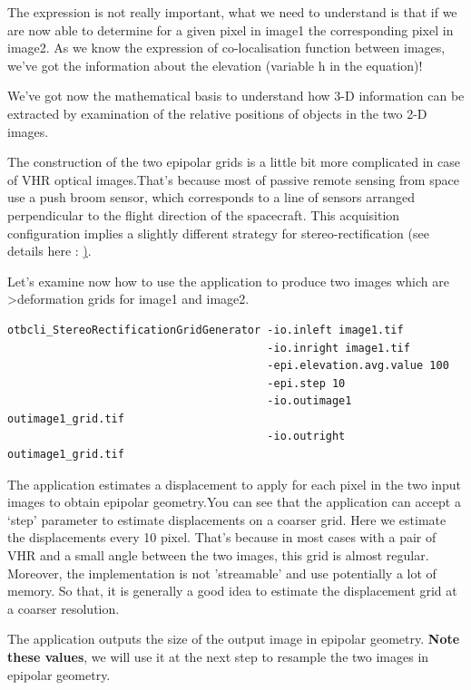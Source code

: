 The expression is not really important, what we need to understand is that if we
are now able to determine for a given pixel in image1 the corresponding pixel in
image2.  As we know the expression of co-localisation function between images,
we've got the information about the elevation (variable h in the equation)!

We've got now the mathematical basis to understand how 3-D information can be
extracted by examination of the relative positions of objects in the two 2-D
images.

The construction of the two epipolar grids is a little bit more complicated in
case of VHR optical images.That's because most of passive remote sensing from
space use a push broom sensor, which corresponds to a line of sensors arranged
perpendicular to the flight direction of the spacecraft. This acquisition
configuration implies a slightly different strategy for stereo-rectification
(see details here :
\href{http://en.wikipedia.org/wiki/Epipolar_geometry#Epipolar_geometry_of_pushbroom_sensor}).

Let's examine now how to use the 
application to produce two images which are \textgreater{deformation grids} for
image1 and image2.

\begin{verbatim}
otbcli_StereoRectificationGridGenerator -io.inleft image1.tif
                                        -io.inright image1.tif
                                        -epi.elevation.avg.value 100
                                        -epi.step 10
                                        -io.outimage1 outimage1_grid.tif
                                        -io.outright outimage1_grid.tif
\end{verbatim}

The application estimates a displacement to apply for each pixel in the two
input images to obtain epipolar geometry.You can see that the application can
accept a `step' parameter to estimate displacements on a coarser grid. Here we
estimate the displacements every 10 pixel. That's because in most cases with a
pair of VHR and a small angle between the two images, this grid is almost
regular.  Moreover, the implementation is not 'streamable' and use potentially a
lot of memory. So that, it is generally a good idea to estimate the displacement
grid at a coarser resolution.

The application outputs the size of the output image in epipolar
geometry. \textbf{Note these values}, we will use it at the next step to
resample the two images in epipolar geometry.

